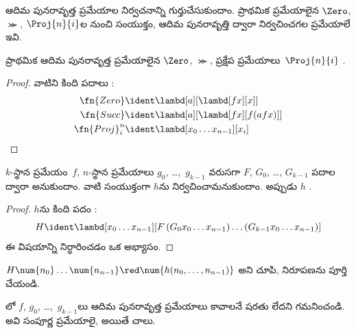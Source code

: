 \documentclass[../../../include/open-logic-section]{subfiles}
\begin{document}

ఆదిమ పునరావృత్త ప్రమేయాల నిర్వచనాన్ని గుర్తుచేసుకుందాం.
ప్రాథమిక ప్రమేయాలైన $\Zero$, $\Succ$, $\Proj{n}{i}$ల నుంచి
సంయుక్తం, ఆదిమ పునరావృత్తి ద్వారా నిర్వచించగల ప్రమేయాలే ఇవి.

\begin{lem}
  ప్రాథమిక ఆదిమ పునరావృత్త ప్రమేయాలైన $\Zero$, $\Succ$,
  ప్రక్షేప ప్రమేయాలు~$\Proj{n}{i}$
  .
\end{lem}

\begin{proof}
వాటిని కింది పదాలు :
\begin{align*}
  \fn{Zero} & \ident \lambd[a][\lambd[fx][x]]\\
  \fn{Succ} & \ident \lambd[a][\lambd[fx][f (a f x)]] \\
  \fn{Proj}^n_i & \ident \lambd[x_0\dots x_{n-1}][x_i]
\end{align*}
\end{proof}

\begin{lem}
   $k$-స్థాన ప్రమేయం~$f$, $n$-స్థాన
  ప్రమేయాలు $g_0$, \dots,~$g_{k-1}$ వరుసగా $F$, $G_0$,
  \dots, $G_{k-1}$ పదాల ద్వారా
  అనుకుందాం. వాటి సంయుక్తంగా $h$ను నిర్వచించామనుకుందాం.
  అప్పుడు $h$ .
\end{lem}

\begin{proof}
  $h$ను కింది పదం :
  \[
  H \ident \lambd[x_0 \dots x_{n-1}][F\, (G_0 x_0 \dots
    x_{n-1}) \dots (G_{k-1} x_0 \dots x_{n-1})]
  \]
ఈ విషయాన్ని నిర్ధారించడం ఒక అభ్యాసం.
\end{proof}

\begin{prob}
  $H\num{n_0}\dots\num{n_{n-1}} \red \num{h(n_0, \dots,
    n_{n-1})}$ అని చూపి, 
  నిరూపణను పూర్తి చేయండి.
\end{prob}

లో $f$, $g_0$, \dots,~$g_{k-1}$లు
ఆదిమ పునరావృత్త ప్రమేయాలు కావాలనే షరతు లేదని గమనించండి.
అవి సంపూర్ణ ప్రమేయాలై, 
అయితే చాలు.
\end{document}
